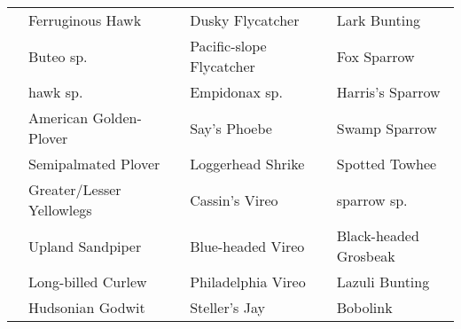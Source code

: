 \documentclass{article}
\begin{document}
\begin{center}
\begin{tabularx}{\textwidth}{cXcXcX}
\underline{\hspace{3ex}} 	 &Ferruginous Hawk 	 &\underline{\hspace{3ex}} 	 &Dusky Flycatcher 	 &\underline{\hspace{3ex}} 	 &Lark Bunting \\ 
\underline{\hspace{3ex}} 	 &Buteo sp. 	 &\underline{\hspace{3ex}} 	 &Pacific-slope Flycatcher 	 &\underline{\hspace{3ex}} 	 &Fox Sparrow \\ 
\underline{\hspace{3ex}} 	 &hawk sp. 	 &\underline{\hspace{3ex}} 	 &Empidonax sp. 	 &\underline{\hspace{3ex}} 	 &Harris's Sparrow \\ 
\underline{\hspace{3ex}} 	 &American Golden-Plover 	 &\underline{\hspace{3ex}} 	 &Say's Phoebe 	 &\underline{\hspace{3ex}} 	 &Swamp Sparrow \\ 
\underline{\hspace{3ex}} 	 &Semipalmated Plover 	 &\underline{\hspace{3ex}} 	 &Loggerhead Shrike 	 &\underline{\hspace{3ex}} 	 &Spotted Towhee \\ 
\underline{\hspace{3ex}} 	 &Greater/Lesser Yellowlegs 	 &\underline{\hspace{3ex}} 	 &Cassin's Vireo 	 &\underline{\hspace{3ex}} 	 &sparrow sp. \\ 
\underline{\hspace{3ex}} 	 &Upland Sandpiper 	 &\underline{\hspace{3ex}} 	 &Blue-headed Vireo 	 &\underline{\hspace{3ex}} 	 &Black-headed Grosbeak \\ 
\underline{\hspace{3ex}} 	 &Long-billed Curlew 	 &\underline{\hspace{3ex}} 	 &Philadelphia Vireo 	 &\underline{\hspace{3ex}} 	 &Lazuli Bunting \\ 
\underline{\hspace{3ex}} 	 &Hudsonian Godwit 	 &\underline{\hspace{3ex}} 	 &Steller's Jay 	 &\underline{\hspace{3ex}} 	 &Bobolink \\ 

\end{tabularx}
\end{center}
\end{document}
